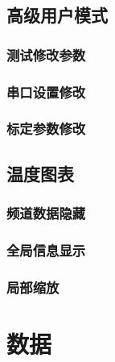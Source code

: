 \subsection{高级用户模式\label{subsec:advancedUser}}
\subsubsection*{测试修改参数}
\subsubsection*{串口设置修改}
\subsubsection*{标定参数修改}
\subsection{温度图表}
\subsubsection*{频道数据隐藏}
\subsubsection*{全局信息显示}
\subsubsection*{局部缩放}
\section{数据}

